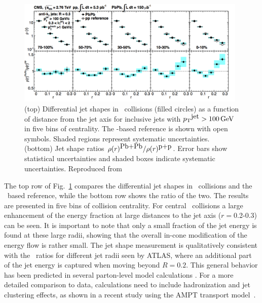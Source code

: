 \begin{figure}[!ht]
\begin{center}
\includegraphics[width=0.98\textwidth]{jetfigures/JetShapes_GR.png}
\caption{\label{fig:JSRatio}
(top) Differential jet shapes in \PbPb\ collisions (filled circles)
as a function of distance from the jet axis for inclusive jets with $\mbox{$p_{\mathrm{T}}$}^{\mbox{jet}} >100\,\mathrm{GeV}$
in five bins of centrality.  The \pp-based reference is shown with open symbols.
Shaded regions represent systematic uncertainties.
(bottom) Jet shape ratios $\rho(r)^{\mbox{Pb+Pb}}/\rho(r)^{\mbox{p+p}}$.
Error bars show statistical uncertainties and shaded boxes indicate systematic uncertainties. 
Reproduced from~\cite{Chatrchyan:2013kwa}}
\label{fig:GR:CMS_jetshapes}
\end{center}
\end{figure}

The top row of Fig.~\ref{fig:GR:CMS_jetshapes} compares the differential jet shapes in \PbPb\
collisions and the \pp\ based reference, while the bottom row shows the ratio of the two.
The results are presented in five bins of collision centrality.
For central \PbPb\ collisions a large enhancement of the energy fraction at large distances
to the jet axis ($r = $0.2-0.3) can be seen. It is important to note that only a small
fraction of the jet energy is found at these large radii, showing that the overall in-cone
modification of the energy flow is rather small.
The jet shape measurement is qualitatively consistent with the \Rcp\ ratios for different jet radii seen by ATLAS,
where an additional part of the jet energy is captured when moving beyond $R = 0.2$.
This general behavior has been predicted in several parton-level model 
calculations \cite{Vitev:2008rz,Renk:2009hv}.
For a more detailed comparison to data, calculations need to include hadronization and 
jet clustering effects, as shown in a recent study using the AMPT transport model~\cite{Ma:2013uqa}.

